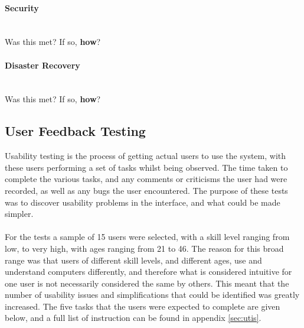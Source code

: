 \paragraph{Security}\ \\
{\color{red} Was this met? If so, \textbf{how}?}

\paragraph{Disaster Recovery}\ \\
{\color{red} Was this met? If so, \textbf{how}?}

\newpage 
\subsection{User Feedback Testing}
Usability testing is the process of getting actual users to use the system, with these users performing a set of tasks whilst being observed. The time taken to complete the various tasks, and any comments or criticisms the user had were recorded, as well as any bugs the user encountered. The purpose of these tests was to discover usability problems in the interface, and what could be made simpler.\ \\
\ \\
For the tests a sample of 15 users were selected, with a skill level ranging from low, to very high, with ages ranging from 21 to 46. The reason for this broad range was that users of different skill levels, and different ages, use and understand computers differently, and therefore what is considered intuitive for one user is not necessarily considered the same by others. This meant that the number of usability issues and simplifications that could be identified was greatly increased. The five tasks that the users were expected to complete are given below, and a full list of instruction can be found in appendix \ref{sec:utis}.

